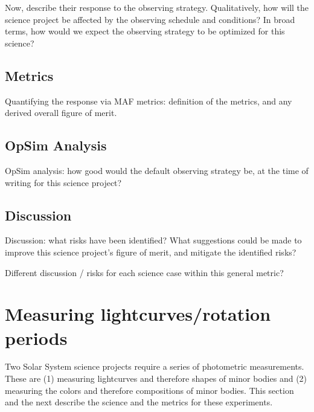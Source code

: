 Now, describe their response to the observing strategy. Qualitatively,
how will the science project be affected by the observing schedule and
conditions? In broad terms, how would we expect the observing strategy
to be optimized for this science?



\subsection{Metrics}
\label{sec:\secname:metrics}

Quantifying the response via MAF metrics: definition of the metrics,
and any derived overall figure of merit.



\subsection{OpSim Analysis}
\label{sec:\secname:analysis}

OpSim analysis: how good would the default observing strategy be, at
the time of writing for this science project?



\subsection{Discussion}
\label{sec:\secname:discussion}

Discussion: what risks have been identified? What suggestions could be
made to improve this science project's figure of merit, and mitigate
the identified risks?

Different discussion / risks for each science case within this general metric?


\section{Measuring lightcurves/rotation periods}
\def\secname{\chpname:lightcurves}\label{sec:\secname}

Two Solar System science projects require
a series of photometric measurements. These
are (1) measuring lightcurves and therefore
shapes of minor bodies and (2) measuring
the colors and therefore compositions of
minor bodies. This section and the next describe
the science and the metrics for these
experiments.

